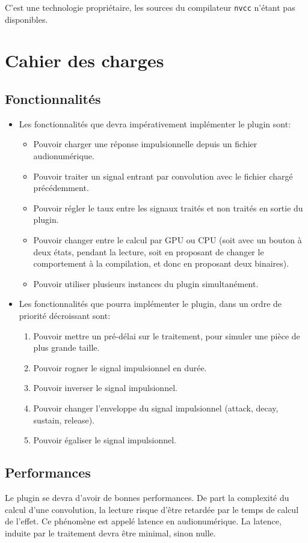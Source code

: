 C'est une technologie propriétaire, les sources du compilateur {\tt nvcc} n'étant pas disponibles.
\section{Cahier des charges}
\subsection{Fonctionnalités}
\begin{itemize}
    \item Les fonctionnalités que devra impérativement implémenter le plugin sont:
    \begin{itemize}
	\item Pouvoir charger une réponse impulsionnelle depuis un fichier audionumérique.
	\item Pouvoir traiter un signal entrant par convolution avec le fichier chargé précédemment.
	\item Pouvoir régler le taux entre les signaux traités et non traités en sortie du plugin.
	\item Pouvoir changer entre le calcul par GPU ou CPU (soit avec un bouton à deux états, pendant la lecture, soit en proposant de changer le comportement à la compilation, et donc en proposant deux binaires).
	\item Pouvoir utiliser plusieurs instances du plugin simultanément.
    \end{itemize}
    \item Les fonctionnalités que pourra implémenter le plugin, dans un ordre de priorité décroissant sont:
    \begin{enumerate}
	\item Pouvoir mettre un pré-délai sur le traitement, pour simuler une pièce de plus grande taille.
	\item Pouvoir rogner le signal impulsionnel en durée.
	\item Pouvoir inverser le signal impulsionnel.
	\item Pouvoir changer l'enveloppe du signal impulsionnel (attack, decay, sustain, release).
	\item Pouvoir égaliser le signal impulsionnel.
    \end{enumerate}
\end{itemize}
\subsection{Performances}
Le plugin se devra d'avoir de bonnes performances. De part la complexité du calcul d'une convolution, la lecture risque d'être retardée par le temps de calcul de l'effet. Ce phénomène est appelé latence en audionumérique.  La latence, induite par le traitement devra être minimal, sinon nulle.


